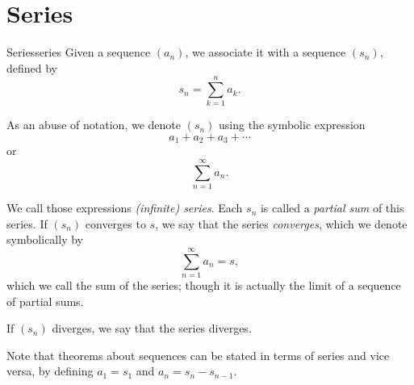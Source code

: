 \section{Series}

\begin{defn}{Series}{series}
	Given a sequence \((a_n)\), we associate it with a sequence \((s_n)\), defined by \[
		s_n = \sum_{k = 1}^n a_k.
	\]

	As an abuse of notation, we denote \((s_n)\) using the symbolic expression \[
		a_1 + a_2 + a_3 + \cdots
	\]
	or \[
		\sum_{n=1}^\infty a_n.
	\]

	We call those expressions \emph{(infinite) series}. Each \(s_n\) is called a \emph{partial sum} of this series. If \((s_n)\) converges to \(s\), we say that the series \emph{converges}, which we denote symbolically by \[
		\sum_{n=1}^\infty a_n = s,
	\]
	which we call the sum of the series; though it is actually the limit of a sequence of partial sums.

	If \((s_n)\) diverges, we say that the series diverges.
\end{defn}

Note that theorems about sequences can be stated in terms of series and vice versa, by defining \(a_1 = s_1\) and \(a_n = s_n - s_{n-1}\). 
